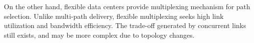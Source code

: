 \documentclass[journal,onecolumn,11pt]{IEEEtran}
\begin{document}
On the other hand, flexible data centers provide multiplexing mechanism for path selection. Unlike multi-path delivery, flexible multiplexing seeks high link utilization and bandwidth efficiency. The trade-off generated by concurrent links still exists, and may be more complex due to topology changes.


%
%
%
\end{document}
